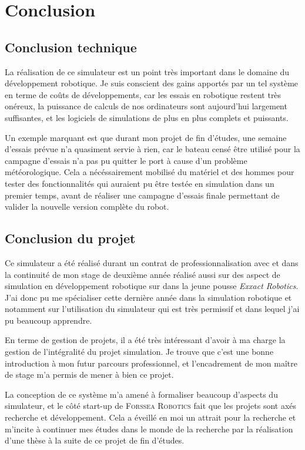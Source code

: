 \chapter{Conclusion}
\label{chapitre:conclusion}
	
	\section{Conclusion technique}

		La réalisation de ce simulateur est un point très important dans le domaine du développement robotique. Je suis conscient des gains apportés par un tel système en terme de coûts de développements, car les essais en robotique restent très onéreux, la puissance de calculs de nos ordinateurs sont aujourd'hui largement suffisantes, et les logiciels de simulations de plus en plus complets et puissants. 
		
		Un exemple marquant est que durant mon projet de fin d'études, une semaine d'essais prévue n'a quasiment servie à rien, car le bateau censé être utilisé pour la campagne d'essais n'a pas pu quitter le port à cause d'un problème météorologique. Cela a nécéssairement mobilisé du matériel et des hommes pour tester des fonctionnalités qui auraient pu être testée en simulation dans un premier temps, avant de réaliser une campagne d'essais finale permettant de valider la nouvelle version complète du robot.
	
	\section{Conclusion du projet}

		Ce simulateur a été réalisé durant un contrat de professionnalisation avec \forssea{} et dans la continuité de mon stage de deuxième année réalisé aussi sur des aspect de simulation en développement robotique sur \gazebo{} dans la jeune pousse \textit{Exxact Robotics}. J'ai donc pu me spécialiser cette dernière année dans la simulation robotique et notamment sur l'utilisation du simulateur \gazebo{} qui est très permissif et dans lequel j'ai pu beaucoup apprendre.

		En terme de gestion de projets, il a été très intéressant d'avoir à ma charge la gestion de l'intégralité du projet simulation. Je trouve que c'est une bonne introduction à mon futur parcours professionnel, et l'encadrement de mon maître de stage m'a permis de mener à bien ce projet.

		La conception de ce système m'a amené à formaliser beaucoup d'aspects du simulateur, et le côté start-up de \textsc{Forssea Robotics} fait que les projets sont axés recherche et développement. Cela a éveillé en moi un attrait pour la recherche et m'incite à continuer mes études dans le monde de la recherche par la réalisation d'une thèse à la suite de ce projet de fin d'études.
